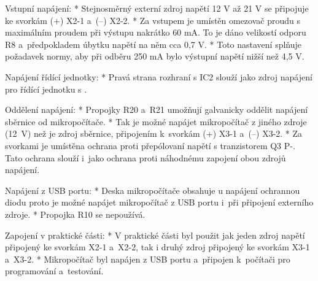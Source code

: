 \medskip
\noindent
{\sbf Vstupní napájení:}
\begitems
    * Stejnosměrný externí zdroj napětí 12 V až 21 V se připojuje ke svorkám (+) X2-1 a~(--) X2-2.
    * Za vstupem je umístěn omezovač proudu s maximálním proudem při výstupu nakrátko 60 mA.
    To je dáno velikostí odporu R8 a~předpokladem úbytku napětí na něm cca 0,7 V.
    * Toto nastavení splňuje požadavek normy, aby při odběru 250 mA bylo výstupní napětí nižší než 4,5 V.
\enditems

\noindent
{\sbf Napájení řídící jednotky:}
\begitems
    * Pravá strana rozhraní s IC2 slouží jako zdroj napájení pro řídící jednotku s .
\enditems

\noindent
{\sbf Oddělení napájení:}
\begitems
    * Propojky R20 a~R21 umožňují galvanicky oddělit napájení sběrnice  od mikropočítače.
    * Tak je možné napájet mikropočítač z jiného zdroje (12~V) než je zdroj sběrnice,
      připojením k~svorkám (+) X3-1 a~(--) X3-2.
    * Za svorkami je umístěna ochrana proti přepólovaní napětí s tranzistorem Q3 P-.
      Tato ochrana slouží i~jako ochrana proti náhodnému zapojení obou zdrojů napájení.
\enditems

\noindent
{\sbf Napájení z USB portu:}
\begitems
    * Deska mikropočítače  obsahuje u napájení ochrannou diodu
        proto je možné napájet mikropočítač z USB portu i~při připojení externího zdroje.
    * Propojka R10 se nepoužívá.
\enditems

\noindent
{\sbf Zapojení v praktické části:}
\begitems
    * V praktické části byl použit jak jeden zdroj napětí připojený ke svorkám X2-1 a~X2-2,
      tak i druhý zdroj připojený ke svorkám {X3-1} a~{X3-2}.
    * Mikropočítač byl napájen z USB portu a~připojen k~počítači pro programování a~testování.
\enditems







